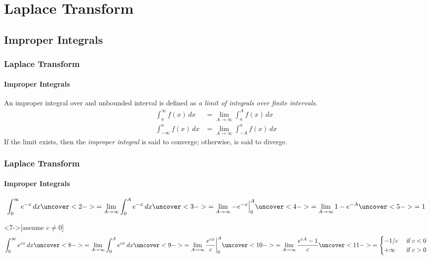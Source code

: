 \documentclass[9pt,xcolor=x11names,compress]{beamer}
\begin{document}
\section{Laplace Transform}
\subsection{Improper Integrals}

\begin{frame}\frametitle{Laplace Transform}
\framesubtitle{Improper Integrals}
An \alert{improper integral} over and unbounded interval is defined as \emph{a limit of integrals over finite intervals}.
\begin{align*}
	\int_a^\infty f(x)\, dx &= \lim_{A\to\infty} \int_a^A f(x)\, dx \\
	\int_{-\infty}^a f(x)\, dx &= \lim_{A\to\infty} \int_{-A}^a f(x)\, dx
\end{align*}
If the limit exists, then the \emph{improper integral} is said to \alert{converge}; otherwise, is said to \alert{diverge}.
\end{frame}

\begin{frame}\frametitle{Laplace Transform}
\framesubtitle{Improper Integrals}
\begin{example}
	\begin{equation*}
		\int_0^\infty e^{-x}\, dx \uncover<2->{= \lim_{A\to \infty} \int_0^A e^{-x}\, dx} \uncover<3->{= \lim_{A\to\infty} -e^{-x}\Big\rvert_{0}^{A}} \uncover<4->{=\lim_{A\to\infty} 1-e^{-A}} \uncover<5->{= 1}
	\end{equation*}
\end{example}

\begin{example}<7->[assume $c\neq 0$]
\begin{equation*}
\int_0^\infty e^{cx}\, dx \uncover<8->{= \lim_{A\to\infty} \int_0^A e^{cx}\, dx}\uncover<9->{= \lim_{A\to\infty} \frac{e^{cx}}{c}\bigg\rvert_0^A}\uncover<10->{= \lim_{A\to\infty} \frac{e^{cA}-1}{c}}\uncover<11->{=\begin{cases}
	-1/c &\text{ if }c<0 \\
	+\infty &\text{ if }c>0
\end{cases}}
\end{equation*}
\end{example}
\end{frame}
\end{document}
